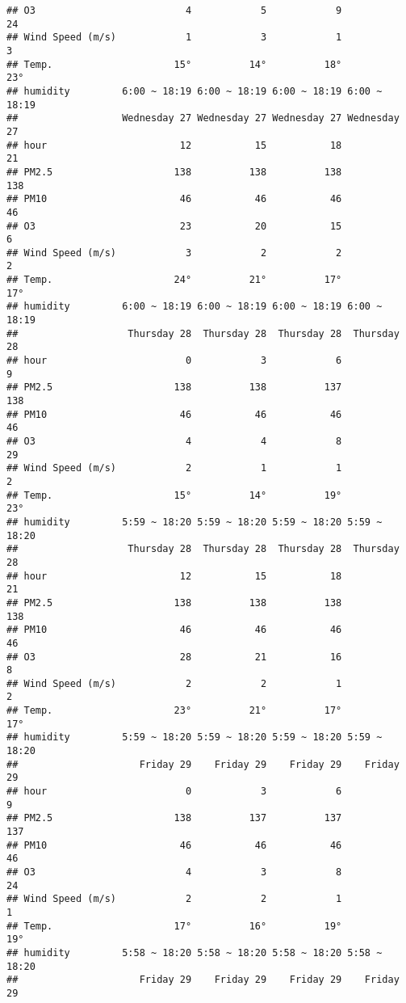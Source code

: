 \documentclass[
]{article}
\begin{document}
\begin{verbatim}
## O3                          4            5            9           24
## Wind Speed (m/s)            1            3            1            3
## Temp.                     15°          14°          18°          23°
## humidity         6:00 ~ 18:19 6:00 ~ 18:19 6:00 ~ 18:19 6:00 ~ 18:19
##                  Wednesday 27 Wednesday 27 Wednesday 27 Wednesday 27
## hour                       12           15           18           21
## PM2.5                     138          138          138          138
## PM10                       46           46           46           46
## O3                         23           20           15            6
## Wind Speed (m/s)            3            2            2            2
## Temp.                     24°          21°          17°          17°
## humidity         6:00 ~ 18:19 6:00 ~ 18:19 6:00 ~ 18:19 6:00 ~ 18:19
##                   Thursday 28  Thursday 28  Thursday 28  Thursday 28
## hour                        0            3            6            9
## PM2.5                     138          138          137          138
## PM10                       46           46           46           46
## O3                          4            4            8           29
## Wind Speed (m/s)            2            1            1            2
## Temp.                     15°          14°          19°          23°
## humidity         5:59 ~ 18:20 5:59 ~ 18:20 5:59 ~ 18:20 5:59 ~ 18:20
##                   Thursday 28  Thursday 28  Thursday 28  Thursday 28
## hour                       12           15           18           21
## PM2.5                     138          138          138          138
## PM10                       46           46           46           46
## O3                         28           21           16            8
## Wind Speed (m/s)            2            2            1            2
## Temp.                     23°          21°          17°          17°
## humidity         5:59 ~ 18:20 5:59 ~ 18:20 5:59 ~ 18:20 5:59 ~ 18:20
##                     Friday 29    Friday 29    Friday 29    Friday 29
## hour                        0            3            6            9
## PM2.5                     138          137          137          137
## PM10                       46           46           46           46
## O3                          4            3            8           24
## Wind Speed (m/s)            2            2            1            1
## Temp.                     17°          16°          19°          19°
## humidity         5:58 ~ 18:20 5:58 ~ 18:20 5:58 ~ 18:20 5:58 ~ 18:20
##                     Friday 29    Friday 29    Friday 29    Friday 29

\end{verbatim}
\end{document}
